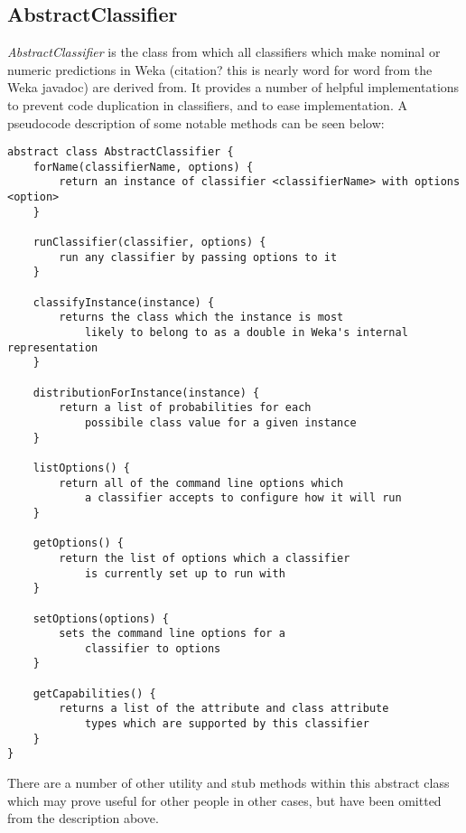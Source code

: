 \subsection{AbstractClassifier}
\textit{AbstractClassifier} is the class from which all classifiers which make nominal or numeric predictions in Weka (citation? this is nearly word for word from the Weka javadoc) are derived from. It provides a number of helpful implementations to prevent code duplication in classifiers, and to ease implementation. A pseudocode description of some notable methods can be seen below:

\begin{footnotesize}
\begin{verbatim}
abstract class AbstractClassifier {
    forName(classifierName, options) {
        return an instance of classifier <classifierName> with options <option>
    }

    runClassifier(classifier, options) {
        run any classifier by passing options to it
    }

    classifyInstance(instance) {
        returns the class which the instance is most 
            likely to belong to as a double in Weka's internal representation
    }

    distributionForInstance(instance) {
        return a list of probabilities for each 
            possibile class value for a given instance
    }

    listOptions() {
        return all of the command line options which 
            a classifier accepts to configure how it will run
    }

    getOptions() {
        return the list of options which a classifier
            is currently set up to run with
    }

    setOptions(options) {
        sets the command line options for a
            classifier to options
    }

    getCapabilities() {
        returns a list of the attribute and class attribute 
            types which are supported by this classifier
    }
}
\end{verbatim}
\end{footnotesize}

There are a number of other utility and stub methods within this abstract class which may prove useful for other people in other cases, but have been omitted from the description above.

